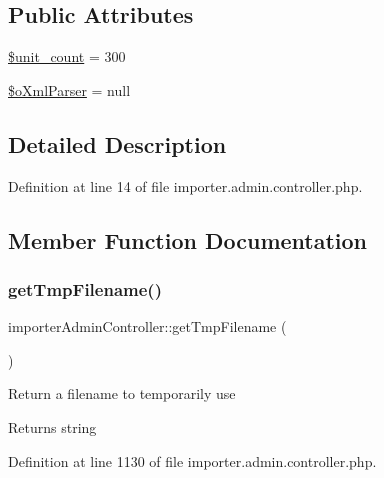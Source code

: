 \subsection*{Public Attributes}
\begin{DoxyCompactItemize}
\item 
\hyperlink{classimporterAdminController_ac425370d30482b23546a0a16da75792c}{\$unit\+\_\+count} = 300
\item 
\hyperlink{classimporterAdminController_a7f08bd88a5e7eeea00c7f201438d1b1b}{\$o\+Xml\+Parser} = null
\end{DoxyCompactItemize}


\subsection{Detailed Description}


Definition at line 14 of file importer.\+admin.\+controller.\+php.



\subsection{Member Function Documentation}
\mbox{\label{classimporterAdminController_a007ae310ca94fb49d96bcdfa3688cb6d}} 
\subsubsection{\texorpdfstring{get\+Tmp\+Filename()}{getTmpFilename()}}
{\footnotesize\ttfamily importer\+Admin\+Controller\+::get\+Tmp\+Filename (\begin{DoxyParamCaption}{ }\end{DoxyParamCaption})}

Return a filename to temporarily use \begin{DoxyReturn}{Returns}
string 
\end{DoxyReturn}


Definition at line 1130 of file importer.\+admin.\+controller.\+php.

\mbox{\label{classimporterAdminController_a259bb7d8ae0b653dc45e544af3100753}} 
